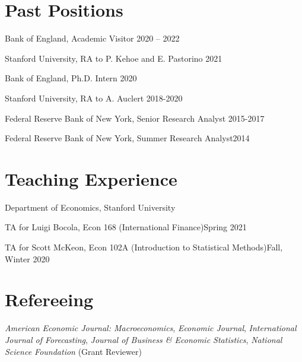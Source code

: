 \documentclass[margin,line]{res}                          %
\newenvironment{list1}{
	\begin{list}{\ding{113}}{%
			\setlength{\itemsep}{0in}
			\setlength{\parsep}{0in} \setlength{\parskip}{0in}
			\setlength{\topsep}{0in} \setlength{\partopsep}{0in}
			\setlength{\leftmargin}{0.17in}}}{\end{list}}
\begin{document}
\begin{resume}
	
	\section{\sc Past Positions}
	\begin{list1}
		\item[] Bank of England, Academic Visitor  \hfill 2020 -- 2022
		\smallskip
		\item[] Stanford University, RA to P. Kehoe and E. Pastorino  \hfill 2021
		\smallskip
		\item[] Bank of England, Ph.D. Intern \hfill 2020
		\smallskip
		\item[] {Stanford University}, RA to A. Auclert  \hfill 2018-2020 \smallskip
		\item[] {Federal Reserve Bank of New York}, Senior Research Analyst  \hfill 2015-2017 \smallskip
		\item[] {Federal Reserve Bank of New York}, Summer Research Analyst\hfill 2014
	\end{list1}
	
	
	\section{\sc Teaching Experience}
	\begin{list1}
		\item[] {Department of Economics, Stanford University} \smallskip
		\item[] TA for Luigi Bocola, Econ 168 (International Finance)\hfill Spring 2021\smallskip
		\item[] TA for Scott McKeon, Econ 102A (Introduction to Statistical Methods)\hfill Fall, Winter 2020\smallskip
	\end{list1}
	
	\section{\sc Refereeing}
	\begin{list1}
		\item[] \emph{American Economic Journal: Macroeconomics}, \emph{Economic Journal}, \emph{International Journal of Forecasting}, \emph{Journal of Business \& Economic Statistics}, \emph{National Science Foundation} (Grant Reviewer) \smallskip
	\end{list1}
	

\end{resume}
\end{document}
